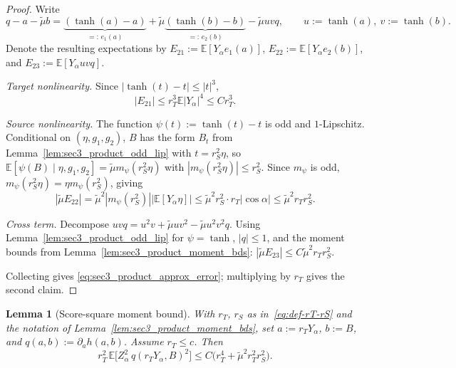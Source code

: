 \documentclass[10pt]{article}
\newtheorem{lemma}{Lemma}
\newcommand{\Ebb}{\mathbb E}
\begin{document}
\begin{proof}
Write
\[
    q-a-\tilde\mu b
    =
    \underbrace{(\tanh(a)-a)}_{=:\,e_1(a)}
    +
    \tilde\mu\underbrace{(\tanh(b)-b)}_{=:\,e_2(b)}
    -
    \tilde\mu uv q,
    \qquad u:=\tanh(a),\ v:=\tanh(b).
\]
Denote the resulting expectations by $E_{21}:=\Ebb[Y_\alpha e_1(a)]$,
$E_{22}:=\Ebb[Y_\alpha e_2(b)]$, and $E_{23}:=\Ebb[Y_\alpha uvq]$.

\textit{Target nonlinearity.}  Since $|\tanh(t)-t|\le|t|^3$,
\[
    |E_{21}|\le r_T^3\Ebb|Y_\alpha|^4\le Cr_T^3.
\]

\textit{Source nonlinearity.}  The function $\psi(t):=\tanh(t)-t$ is odd and
$1$-Lipschitz.  Conditional on $(\eta,g_1,g_2)$, $B$ has the form $B_t$ from
Lemma~\ref{lem:sec3_product_odd_lip} with $t=r_S^2\eta$, so
$\Ebb[\psi(B)\mid\eta,g_1,g_2]=\tilde\mu m_\psi(r_S^2\eta)$ with
$|m_\psi(r_S^2\eta)|\le r_S^2$.  Since $m_\psi$ is odd,
$m_\psi(r_S^2\eta)=\eta m_\psi(r_S^2)$, giving
\[
    |\tilde\mu E_{22}|=\tilde\mu^2|m_\psi(r_S^2)||\Ebb[Y_\alpha\eta]|
    \le\tilde\mu^2 r_S^2\cdot r_T|\cos\alpha|
    \le\tilde\mu^2 r_T r_S^2.
\]

\textit{Cross term.}  Decompose $uvq=u^2v+\tilde\mu uv^2-\tilde\mu u^2v^2 q$.
Using Lemma~\ref{lem:sec3_product_odd_lip} for $\psi=\tanh$, $|q|\le1$,
and the moment bounds from Lemma~\ref{lem:sec3_product_moment_bds}:
$|\tilde\mu E_{23}|\le C\tilde\mu^2 r_T r_S^2$.

Collecting gives \eqref{eq:sec3_product_approx_error}; multiplying by $r_T$
gives the second claim.
\end{proof}

\begin{lemma}[Score-square moment bound]
\label{lem:sec3_product_score_sq}
With $r_T$, $r_S$ as in~\eqref{eq:def-rT-rS} and the notation of
Lemma~\ref{lem:sec3_product_moment_bds}, set $a:=r_T Y_\alpha$, $b:=B$,
and $q(a,b):=\partial_a h(a,b)$.  Assume $r_T\le c$.  Then
\begin{equation}
\label{eq:sec3_product_score_sq}
    r_T^2\,\Ebb\!\bigl[Z_\alpha^2\,q(r_T Y_\alpha,B)^2\bigr]
    \le
    C\bigl(r_T^4+\tilde\mu^2 r_T^2 r_S^2\bigr).
\end{equation}
\end{lemma}
\end{document}
